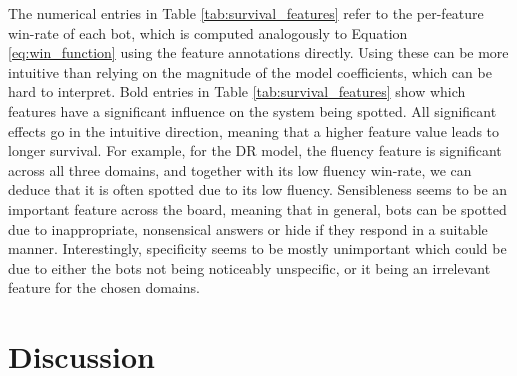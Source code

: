 \documentclass[11pt,a4paper]{article}
\begin{document}
The numerical entries in Table \ref{tab:survival_features} refer to the per-feature win-rate of each bot, which is computed analogously to Equation \ref{eq:win_function} using the feature annotations directly. Using these can be more intuitive than relying on the magnitude of the model coefficients, which can be hard to interpret.
Bold entries in Table \ref{tab:survival_features} show which features have a significant influence on the system being spotted. All significant effects go in the intuitive direction, meaning that a higher feature value leads to longer survival.  For example, for the DR model, the fluency feature is significant across all three domains, and together with its low fluency win-rate, we can deduce that it is often spotted due to its low fluency. Sensibleness seems to be an important feature across the board, meaning that in general, bots can be spotted due to inappropriate, nonsensical answers or hide if they respond in a suitable manner. Interestingly, specificity seems to be mostly unimportant which could be due to either the bots not being noticeably unspecific, or it being an irrelevant feature for the chosen domains.

\section{Discussion}
\end{document}
